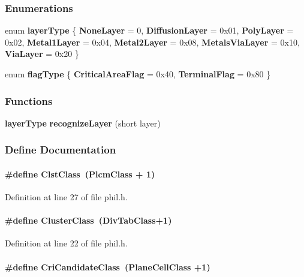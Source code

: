 \subsubsection*{Enumerations}
\begin{CompactItemize}
\item 
enum {\bf layer\-Type} \{ {\bf None\-Layer} = 0, 
{\bf Diffusion\-Layer} = 0x01, 
{\bf Poly\-Layer} = 0x02, 
{\bf Metal1Layer} = 0x04, 
{\bf Metal2Layer} = 0x08, 
{\bf Metals\-Via\-Layer} = 0x10, 
{\bf Via\-Layer} = 0x20
 \}
\item 
enum {\bf flag\-Type} \{ {\bf Critical\-Area\-Flag} = 0x40, 
{\bf Terminal\-Flag} = 0x80
 \}
\end{CompactItemize}
\subsubsection*{Functions}
\begin{CompactItemize}
\item 
{\bf layer\-Type} {\bf recognize\-Layer} (short layer)
\end{CompactItemize}


\subsubsection{Define Documentation}
\label{phil.h_a7}
\paragraph{\setlength{\rightskip}{0pt plus 5cm}\#define Clst\-Class\ (Plcm\-Class + 1)}\hfill



Definition at line 27 of file phil.h.\label{phil.h_a2}
\paragraph{\setlength{\rightskip}{0pt plus 5cm}\#define Cluster\-Class\ (Div\-Tab\-Class+1)}\hfill



Definition at line 22 of file phil.h.\label{phil.h_a13}
\paragraph{\setlength{\rightskip}{0pt plus 5cm}\#define Cri\-Candidate\-Class\ (Plane\-Cell\-Class +1)}\hfill



